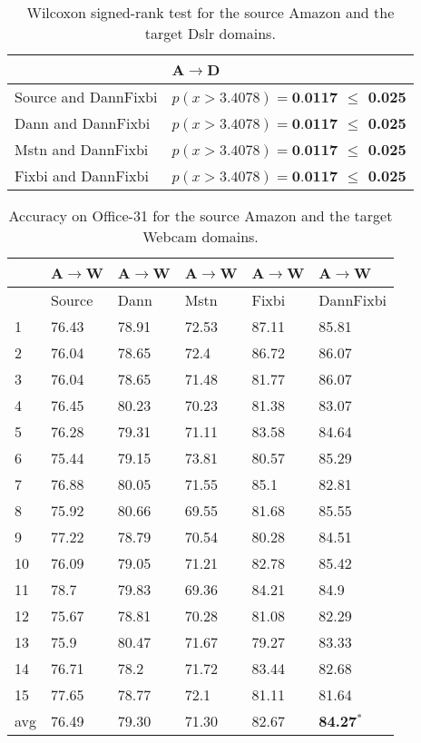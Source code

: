 \begin{table}[h]
\centering
\caption{Wilcoxon signed-rank test for the source Amazon and the target Dslr domains.}
\label{tab:AD_wil}
\begin{tabular}{|l|l|}
\hline
 & A$\rightarrow$D \\ \hline
Source and DannFixbi & \textbf{$p(x > 3.4078) = \textbf{0.0117}$ $\leq$ 0.025} \\ \hline
Dann and DannFixbi & \textbf{$p(x > 3.4078) = \textbf{0.0117} $ $\leq$ 0.025} \\ \hline
Mstn and DannFixbi & \textbf{$p(x > 3.4078) = \textbf{0.0117}$ $\leq$ 0.025} \\ \hline
Fixbi and DannFixbi & \textbf{$p(x > 3.4078) = \textbf{0.0117}$ $\leq$ 0.025} \\ \hline
\end{tabular}
\end{table}

\begin{table}[H]
\centering
\caption{Accuracy on Office-31 for the source Amazon and the target Webcam domains.}
\label{tab:AW}
\begin{tabular}{|p{2cm}|p{2cm}|p{2cm}|p{2cm}|p{2cm}|p{2cm}|}
\hline
   & A$\rightarrow$W & A$\rightarrow$W & A$\rightarrow$W & A$\rightarrow$W & A$\rightarrow$W \\ \hline
 & Source & Dann & Mstn & Fixbi & DannFixbi \\ \hline
1 & 76.43 & 78.91 & 72.53 & 87.11 & 85.81 \\ \hline
2 & 76.04 & 78.65 & 72.4 & 86.72 & 86.07 \\ \hline
3 & 76.04 & 78.65 & 71.48 & 81.77 & 86.07 \\ \hline
4 & 76.45 & 80.23 & 70.23 & 81.38 & 83.07 \\ \hline
5 & 76.28 & 79.31 & 71.11 & 83.58 & 84.64 \\ \hline
6 & 75.44 & 79.15 & 73.81 & 80.57 & 85.29 \\ \hline
7 & 76.88 & 80.05 & 71.55 & 85.1 & 82.81 \\ \hline
8 & 75.92 & 80.66 & 69.55 & 81.68 & 85.55 \\ \hline
9 & 77.22 & 78.79 & 70.54 & 80.28 & 84.51 \\ \hline
10 & 76.09 & 79.05 & 71.21 & 82.78 & 85.42 \\ \hline
11 & 78.7 & 79.83 & 69.36 & 84.21 & 84.9 \\ \hline
12 & 75.67 & 78.81 & 70.28 & 81.08 & 82.29 \\ \hline
13 & 75.9 & 80.47 & 71.67 & 79.27 & 83.33 \\ \hline
14 & 76.71 & 78.2 & 71.72 & 83.44 & 82.68 \\ \hline
15 & 77.65 & 78.77 & 72.1 & 81.11 & 81.64 \\ \hline
avg & 76.49 & 79.30 & 71.30 & 82.67 & \textbf{84.27}$^*$ \\ \hline
\end{tabular}
\end{table}

